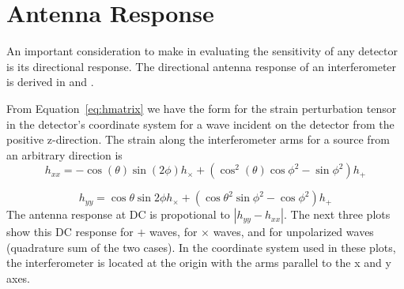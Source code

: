 \chapter{Antenna Response}
\label{app:peanut}


An important consideration to make in evaluating the sensitivity of any
detector is its directional response. The directional antenna response of
an interferometer is derived in \cite{Sigg:GW} and \cite{Nelson:Thesis}.

From Equation~\ref{eq:hmatrix} we have the form for the strain perturbation
tensor in the detector's coordinate system for a wave incident on the detector
from the positive z-direction. The strain along the interferometer arms
for a source from an arbitrary direction is
\begin{equation}
h_{xx} = - \cos(\theta) \sin(2 \phi) h_{\times} +
          (\cos^2(\theta) \cos{\phi}^2 - \sin{\phi}^2) h_{+}
\end{equation}

\begin{equation}
h_{yy} =  \cos{\theta} \sin{2 \phi} h_{\times} +
          (\cos{\theta}^2 \sin{\phi}^2 - \cos{\phi}^2) h_{+}
\end{equation}
The antenna response at DC is propotional to $|h_{yy}-h_{xx}|$. The next three
plots show this DC response for $+$ waves, for $\times$ waves, and for unpolarized
waves (quadrature sum of the two cases). In the coordinate system used in these
plots, the interferometer is located at the origin with the arms parallel to the
x and y axes.


